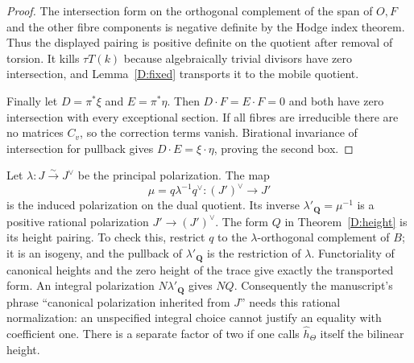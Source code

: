 \begin{proof}
The intersection form on the orthogonal complement of the span of
$O,F$ and the other fibre components is negative definite by the Hodge
index theorem.  Thus the displayed pairing is positive definite on the
quotient after removal of torsion.  It kills $\tau T(k)$ because
algebraically trivial divisors have zero intersection, and
Lemma~\ref{D:fixed} transports it to the mobile quotient.

Finally let $D=\pi^*\xi$ and $E=\pi^*\eta$.  Then $D\cdot F=E\cdot F=0$
and both have zero intersection with every exceptional section.
If all fibres are irreducible there are no matrices $C_v$, so the
correction terms vanish.  Birational invariance of intersection for
pullback gives $D\cdot E=\xi\cdot\eta$, proving the second box.
\end{proof}

\begin{remark}
\label{D:quotient-polarization}
Let $\lambda:J\xrightarrow{\sim}J^\vee$ be the principal polarization.
The map
\[
       \mu=q\lambda^{-1}q^\vee:(J')^\vee\longrightarrow J'
\]
is the induced polarization on the dual quotient.  Its inverse
$\lambda'_{\mathbf Q}=\mu^{-1}$ is a positive rational polarization
$J'\to(J')^\vee$.  The form $Q$ in Theorem~\ref{D:height} is its height
pairing.  To check this, restrict $q$ to the $\lambda$-orthogonal
complement of $B$; it is an isogeny, and the pullback of
$\lambda'_{\mathbf Q}$ is the restriction of $\lambda$.  Functoriality
of canonical heights and the zero height of the trace give exactly the
transported form.  An integral polarization $N\lambda'_{\mathbf Q}$
gives $NQ$.  Consequently the manuscript's phrase ``canonical
polarization inherited from $J$'' needs this rational normalization:
an unspecified integral choice cannot justify an equality with coefficient
one.  There is a separate factor of two if one calls
$\widehat h_\Theta$ itself the bilinear height.
\end{remark}

